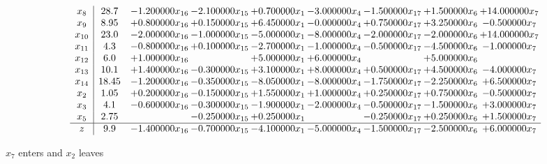 \documentclass[10pt]{article}
\begin{document}
 \[\begin{array}{c| c c@{\hskip 2pt} c@{\hskip 2pt} c@{\hskip 2pt} c@{\hskip 2pt} c@{\hskip 2pt} c@{\hskip 2pt} c@{\hskip 2pt} }
 x_{8}   &  28.7 & -1.200000 x_{16} & -2.100000 x_{15} & + 0.700000 x_{1} & -3.000000 x_{4} & -1.500000 x_{17} & + 1.500000 x_{6} & + 14.000000 x_{7}\\
 x_{9}   &  8.95 & + 0.800000 x_{16} & + 0.150000 x_{15} & + 6.450000 x_{1} & -0.000000 x_{4} & + 0.750000 x_{17} & + 3.250000 x_{6} & -0.500000 x_{7}\\
 x_{10}   &  23.0 & -2.000000 x_{16} & -1.000000 x_{15} & -5.000000 x_{1} & -8.000000 x_{4} & -2.000000 x_{17} & -2.000000 x_{6} & + 14.000000 x_{7}\\
 x_{11}   &  4.3 & -0.800000 x_{16} & + 0.100000 x_{15} & -2.700000 x_{1} & -1.000000 x_{4} & -0.500000 x_{17} & -4.500000 x_{6} & -1.000000 x_{7}\\
 x_{12}   &  6.0 & + 1.000000 x_{16} &   & + 5.000000 x_{1} & + 6.000000 x_{4} &   & + 5.000000 x_{6} &   \\
 x_{13}   &  10.1 & + 1.400000 x_{16} & -0.300000 x_{15} & + 3.100000 x_{1} & + 8.000000 x_{4} & + 0.500000 x_{17} & + 4.500000 x_{6} & -4.000000 x_{7}\\
 x_{14}   &  18.45 & -1.200000 x_{16} & -0.350000 x_{15} & -8.050000 x_{1} & -8.000000 x_{4} & -1.750000 x_{17} & -2.250000 x_{6} & + 6.500000 x_{7}\\
 x_{2}   &  1.05 & + 0.200000 x_{16} & -0.150000 x_{15} & + 1.550000 x_{1} & + 1.000000 x_{4} & + 0.250000 x_{17} & + 0.750000 x_{6} & -0.500000 x_{7}\\
 x_{3}   &  4.1 & -0.600000 x_{16} & -0.300000 x_{15} & -1.900000 x_{1} & -2.000000 x_{4} & -0.500000 x_{17} & -1.500000 x_{6} & + 3.000000 x_{7}\\
 x_{5}   &  2.75  &   & -0.250000 x_{15} & + 0.250000 x_{1} &   & -0.250000 x_{17} & + 0.250000 x_{6} & + 1.500000 x_{7}\\
\hline
z    &  9.9 & -1.400000 x_{16} & -0.700000 x_{15} & -4.100000 x_{1} & -5.000000 x_{4} & -1.500000 x_{17} & -2.500000 x_{6} & + 6.000000 x_{7}\\
\end{array}\]


 $ x_{7} $ enters and $ x_{2} $ leaves 
\end{document}
